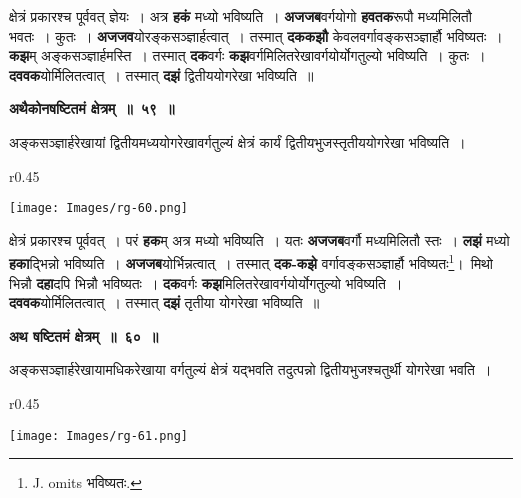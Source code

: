 \documentclass[11pt, openany]{book}
\begin{document}
 क्षेत्रं प्रकारश्च पूर्ववत् ज्ञेयः~। अत्र \textbf{हकं} मध्यो भविष्यति~। \textbf{अजजब}वर्गयोगो \textbf{हवतक}रूपौ मध्यमिलितौ भवतः~। कुतः~। \textbf{अजजव}योरङ्कसञ्ज्ञार्हत्वात्~। तस्मात् \textbf{दककझौ} केवलवर्गावङ्कसञ्ज्ञार्हौ भविष्यतः~। \textbf{कझ}म् अङ्कसञ्ज्ञार्हमस्ति~। तस्मात् \textbf{दक}वर्गः \textbf{कझ}वर्गमिलितरेखावर्गयोर्योगतुल्यो भविष्यति~। कुतः~। \textbf{दववक}योर्मिलितत्वात्~। तस्मात् \textbf{दझं} द्वितीययोगरेखा भविष्यति~॥ 
\vspace{2mm}

\begin{center}
\textbf{\large अथैकोनषष्टितमं क्षेत्रम्~॥~५९~॥}
\end{center}

{\ab अङ्कसञ्ज्ञार्हरेखायां द्वितीयमध्ययोगरेखावर्गतुल्यं क्षेत्रं कार्यं द्वितीयभुजस्तृतीययोगरेखा भविष्यति~। }\\

\begin{wrapfigure}{r}{0.45\textwidth}
\vspace{-8mm}
\begin{flushright}
\texttt{[image: Images/rg-60.png]}
\end{flushright}
\vspace{-8mm}
\end{wrapfigure}

 क्षेत्रं प्रकारश्च पूर्ववत्~। परं \textbf{हक}म् अत्र मध्यो भविष्यति~। यतः \textbf{अजजब}वर्गौ मध्यमिलितौ स्तः~। \textbf{लझं} मध्यो \textbf{हका}द्भिन्नो भविष्यति~। \textbf{अजजब}योर्भिन्नत्वात्~। तस्मात् \textbf{दक-कझे} \;वर्गावङ्कसञ्ज्ञार्हौ \;भविष्यतः\renewcommand{\thefootnote}{१}\footnote{J. omits भविष्यतः.}\;। \,मिथो भिन्नौ \textbf{दहा}दपि भिन्नौ भविष्यतः~। \textbf{दक}वर्गः \textbf{कझ}मिलितरेखावर्गयोर्योगतुल्यो भविष्यति~। \textbf{दववक}योर्मिलितत्वात्~। तस्मात् \textbf{दझं} तृतीया योगरेखा भविष्यति~॥ 
\vspace{2mm}

\begin{center}
\textbf{\large अथ षष्टितमं क्षेत्रम्~॥~६०~॥ }
\end{center}

 {\ab अङ्कसञ्ज्ञार्हरेखायामधिकरेखाया वर्गतुल्यं क्षेत्रं यद्भवति तदुत्पन्नो द्वितीयभुजश्चतुर्थी योगरेखा भवति~।} 

\newpage

\begin{wrapfigure}{r}{0.45\textwidth}
\vspace{-5mm}
\begin{flushright}
\texttt{[image: Images/rg-61.png]}
\end{flushright}
\vspace{-8mm}
\end{wrapfigure}
\end{document}
